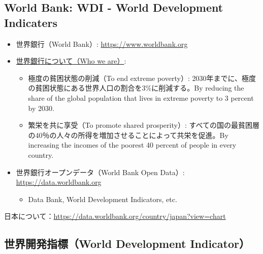 \documentclass[
  xelatex, ja=standard]{bxjsbook}
\providecommand{\tightlist}{%
  \setlength{\itemsep}{0pt}\setlength{\parskip}{0pt}}
\theoremstyle{definition}
\theoremstyle{definition}
\theoremstyle{definition}
\theoremstyle{definition}
\theoremstyle{remark}
\begin{document}
\hypertarget{world-bank-wdi---world-development-indicaters}{%
\subsection{World Bank: WDI - World Development Indicaters}\label{world-bank-wdi---world-development-indicaters}}

\begin{itemize}
\tightlist
\item
  世界銀行（World Bank）: \url{https://www.worldbank.org}
\item
  \href{https://www.worldbank.org/en/who-we-are}{世界銀行について（Who we are）}:

  \begin{itemize}
  \tightlist
  \item
    極度の貧困状態の削減（To end extreme poverty）: 2030年までに、極度の貧困状態にある世界人口の割合を3\%に削減する。By reducing the share of the global population that lives in extreme poverty to 3 percent by 2030.
  \item
    繁栄を共に享受（To promote shared prosperity）: すべての国の最貧困層の40％の人々の所得を増加させることによって共栄を促進。By increasing the incomes of the poorest 40 percent of people in every country.
  \end{itemize}
\item
  世界銀行オープンデータ（World Bank Open Data）: \url{https://data.worldbank.org}

  \begin{itemize}
  \tightlist
  \item
    Data Bank, World Development Indicators, etc.
  \end{itemize}
\end{itemize}

日本について：\url{https://data.worldbank.org/country/japan?view=chart}

\hypertarget{ux4e16ux754cux958bux767aux6307ux6a19world-development-indicator}{%
\subsection{世界開発指標（World Development Indicator）}\label{ux4e16ux754cux958bux767aux6307ux6a19world-development-indicator}}
\end{document}

